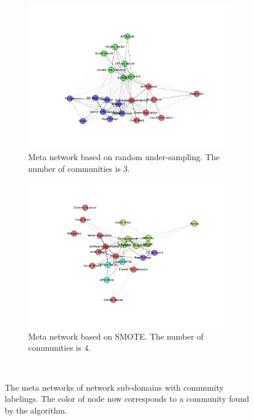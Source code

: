 \documentclass{article}
\begin{document}
\begin{figure}[H]
	\medskip
	\begin{subfigure}{0.48\textwidth}
	\includegraphics[width=\linewidth]{figs/similarity/SubDomain/RandomUnder_all5/g_community.png}
	\caption{Meta network based on random under-sampling.  The number of communities is $3$.} \label{random_under_graph_sub_community}
	\end{subfigure}\hspace*{\fill}
	\begin{subfigure}{0.48\textwidth}
	\includegraphics[width=\linewidth]{figs/similarity/SubDomain/SMOTE/g_community.png}
	\caption{Meta network based on SMOTE.  The number of communities is $4$.} \label{SMOTE_graph_sub_community}
	\end{subfigure}
\
\caption{The meta networks of network sub-domains with community labelings. The color of node now corresponds to a community found by the algorithm.} \label{meta_network_community}
\end{figure}
\end{document}
